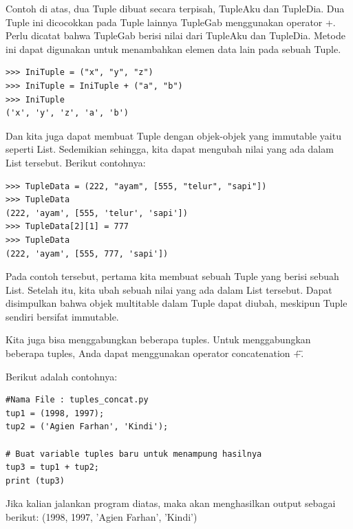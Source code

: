 Contoh di atas, dua Tuple dibuat secara terpisah, TupleAku dan TupleDia. 
Dua Tuple ini dicocokkan pada Tuple lainnya TupleGab menggunakan operator +.
Perlu dicatat bahwa TupleGab berisi nilai dari TupleAku dan TupleDia. 
Metode ini dapat digunakan untuk menambahkan elemen data lain pada sebuah Tuple. 
\begin{verbatim}
>>> IniTuple = ("x", "y", "z") 
>>> IniTuple = IniTuple + ("a", "b")
>>> IniTuple 
('x', 'y', 'z', 'a', 'b') 
\end{verbatim}
Dan kita juga dapat membuat Tuple dengan objek-objek yang immutable yaitu seperti List. Sedemikian sehingga, kita dapat mengubah nilai yang ada dalam List tersebut. Berikut contohnya: 
\begin{verbatim}
>>> TupleData = (222, "ayam", [555, "telur", "sapi"]) 
>>> TupleData 
(222, 'ayam', [555, 'telur', 'sapi']) 
>>> TupleData[2][1] = 777 
>>> TupleData 
(222, 'ayam', [555, 777, 'sapi']) 
\end{verbatim}
Pada contoh tersebut, pertama kita membuat sebuah Tuple yang berisi sebuah List. Setelah itu, kita ubah sebuah nilai yang ada dalam List tersebut. Dapat disimpulkan bahwa objek multitable dalam Tuple dapat diubah, meskipun Tuple sendiri bersifat immutable. 

Kita juga bisa menggabungkan beberapa tuples. Untuk menggabungkan beberapa tuples, Anda dapat menggunakan operator concatenation \"+\". 

Berikut adalah contohnya: 
\begin{verbatim}
#Nama File : tuples_concat.py 
tup1 = (1998, 1997); 
tup2 = ('Agien Farhan', 'Kindi'); 

# Buat variable tuples baru untuk menampung hasilnya 
tup3 = tup1 + tup2; 
print (tup3) 
\end{verbatim}
Jika kalian jalankan program diatas, maka akan menghasilkan output sebagai berikut: 
(1998, 1997, 'Agien Farhan', 'Kindi') 


